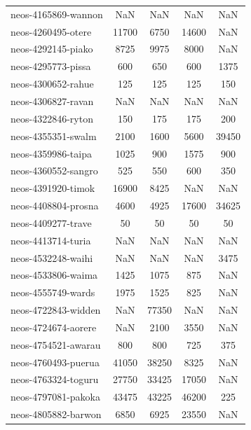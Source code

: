 \begin{longtable}{lcccc}
neos-4165869-wannon         &      NaN &      NaN &      NaN &   NaN \\
neos-4260495-otere          &    11700 &     6750 &    14600 &   NaN \\
neos-4292145-piako          &     8725 &     9975 &     8000 &   NaN \\
neos-4295773-pissa          &      600 &      650 &      600 &  1375 \\
neos-4300652-rahue          &      125 &      125 &      125 &   150 \\
neos-4306827-ravan          &      NaN &      NaN &      NaN &   NaN \\
neos-4322846-ryton          &      150 &      175 &      175 &   200 \\
neos-4355351-swalm          &     2100 &     1600 &     5600 & 39450 \\
neos-4359986-taipa          &     1025 &      900 &     1575 &   900 \\
neos-4360552-sangro         &      525 &      550 &      600 &   350 \\
neos-4391920-timok          &    16900 &     8425 &      NaN &   NaN \\
neos-4408804-prosna         &     4600 &     4925 &    17600 & 34625 \\
neos-4409277-trave          &       50 &       50 &       50 &    50 \\
neos-4413714-turia          &      NaN &      NaN &      NaN &   NaN \\
neos-4532248-waihi          &      NaN &      NaN &      NaN &  3475 \\
neos-4533806-waima          &     1425 &     1075 &      875 &   NaN \\
neos-4555749-wards          &     1975 &     1525 &      825 &   NaN \\
neos-4722843-widden         &      NaN &    77350 &      NaN &   NaN \\
neos-4724674-aorere         &      NaN &     2100 &     3550 &   NaN \\
neos-4754521-awarau         &      800 &      800 &      725 &   375 \\
neos-4760493-puerua         &    41050 &    38250 &     8325 &   NaN \\
neos-4763324-toguru         &    27750 &    33425 &    17050 &   NaN \\
neos-4797081-pakoka         &    43475 &    43225 &    46200 &   225 \\
neos-4805882-barwon         &     6850 &     6925 &    23550 &   NaN \\

\end{longtable}
